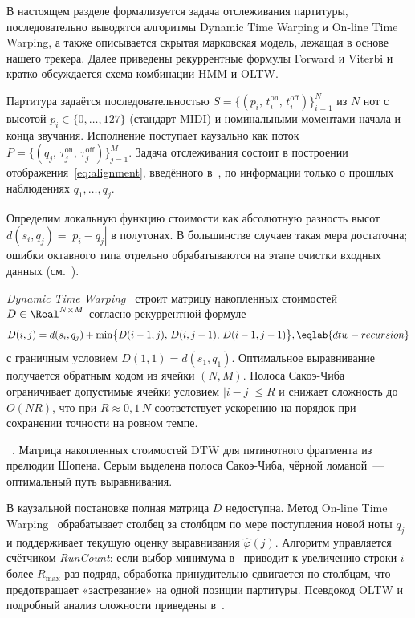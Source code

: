%
В настоящем разделе формализуется задача отслеживания партитуры,
последовательно выводятся алгоритмы Dynamic Time Warping и On-line
Time Warping, а также описывается скрытая марковская модель, лежащая в
основе нашего трекера. Далее приведены рекуррентные формулы Forward и
Viterbi и кратко обсуждается схема комбинации HMM и OLTW.

Партитура задаётся последовательностью
$S=\{(p_i,\,t_i^{\text{on}},\,t_i^{\text{off}})\}_{i=1}^{N}$
из $N$ нот с высотой $p_i\in\{0,\dots,127\}$ (стандарт MIDI) и
номинальными моментами начала и конца звучания. Исполнение поступает
каузально как поток
$P=\{(q_j,\,\tau_j^{\text{on}},\,\tau_j^{\text{off}})\}_{j=1}^{M}$.
Задача отслеживания состоит в построении отображения~\eqref{eq:alignment},
введённого в~, по информации только о прошлых
наблюдениях $q_1,\dots,q_j$.

Определим локальную функцию стоимости как абсолютную разность высот
$d(s_i,q_j) = |p_i - q_j|$ в полутонах. В большинстве случаев такая
мера достаточна; ошибки октавного типа отдельно обрабатываются на
этапе очистки входных данных (см.~).

\textit{Dynamic Time Warping}~\cite{SakoeChiba1978,Mueller2007} строит
матрицу накопленных стоимостей $D\in\Real^{N\times M}$ согласно
рекуррентной формуле
\begin{equation}
D(i,j) = d(s_i,q_j) + \min\bigl\{D(i-1,j),\,D(i,j-1),\,
                                  D(i-1,j-1)\bigr\},
\eqlab{dtw-recursion}
\end{equation}
с граничным условием $D(1,1)=d(s_1,q_1)$. Оптимальное выравнивание
получается обратным ходом из ячейки $(N,M)$. Полоса Сакоэ-Чиба
ограничивает допустимые ячейки условием $|i-j|\le R$ и снижает
сложность до $O(NR)$, что при $R\approx 0{,}1\,N$ соответствует
ускорению на порядок при сохранении точности на ровном темпе.

\par\addvspace{2pt}
{\centering
{}%
\resizebox{0.85\columnwidth}{!}{}\par
\vspace{2pt}
\footnotesize
\figurename~\thefigure. Матрица накопленных стоимостей DTW для
пятинотного фрагмента из прелюдии Шопена. Серым выделена полоса
Сакоэ-Чиба, чёрной ломаной~--- оптимальный путь выравнивания.\par}
\addvspace{4pt}

В каузальной постановке полная матрица $D$ недоступна. Метод On-line
Time Warping~\cite{Dixon2005} обрабатывает столбец за столбцом по мере
поступления новой ноты $q_j$ и поддерживает текущую оценку
выравнивания $\hat\varphi(j)$. Алгоритм управляется счётчиком
\textit{RunCount}: если выбор минимума в~ приводит
к увеличению строки $i$ более $R_{\max}$ раз подряд, обработка
принудительно сдвигается по столбцам, что предотвращает «застревание»
на одной позиции партитуры. Псевдокод OLTW и подробный анализ
сложности приведены в~.

